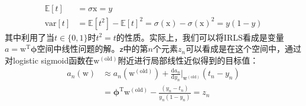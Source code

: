 \documentclass[b5paper]{book}
\numberwithin{equation}{chapter}
\newcommand {\bx} {\boldsymbol{\mathrm{x}}}
\newcommand {\bw} {\boldsymbol{\mathrm{w}}}
\newcommand {\sfz} {\boldsymbol{\mathsf{z}}}
\newcommand {\rmT} {\mathrm{T}}
\newcommand {\rmd} {\mathrm{d}}
\newcommand {\bfphi} {\boldsymbol{\phi}}
\begin{document}
{	\begin{align}
		\mathbb{E}[t] &= \sigma{\bx} =y \\
		\mathrm{var}[t] &= \mathbb{E}[t^2] - \mathbb{E}[t]^2 = \sigma(\bx) - \sigma(\bx)^2 = y(1 - y)
	\end{align}
	其中利用了当$t \in \{0,1\}$时$t^2 = t$的性质。实际上，我们可以将IRLS看成是变量$a = \bw^{\rmT}\bfphi$空间中线性问题的解。$\sfz$中的第$n$个元素$z_n$可以看成是在这个空间中，通过对logistic sigmoid函数在$\bw^{(\mathrm{old})}$附近进行局部线性近似得到的目标值：
	\begin{equation}
	\begin{split}
		a_n(\bw) &\approx a_n (\bw^{(\mathrm{old})}) + \frac{\rmd a_n}{\rmd y_n}\bigg|_{\bw^{(\mathrm{old})}} (t_n - y_n) \\
		&= \bfphi^{\rmT} \bw^{(\mathrm{old})} - \frac{(y_n - t_n)}{y_n(1-y_n)} = z_n
	\end{split}
	\end{equation}
	}
\end{document}
